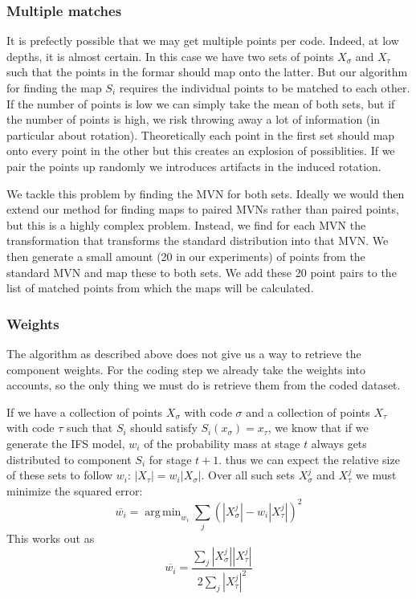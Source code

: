 \documentclass[11pt, twocolumn]{article}
\theoremstyle{definition}
\DeclareMathOperator*{\argmin}{arg\,min}
\begin{document}
\subsubsection{Multiple matches}

It is prefectly possible that we may get multiple points per code. Indeed, at low depths, it is almost certain. In this case we have two sets of points $X_\sigma$ and $X_\tau$ such that the points in the formar should map onto the latter. But our algorithm for finding the map $S_i$ requires the individual points to be matched to each other. If the number of points is low we can simply take the mean of both sets, but if the number of points is high, we risk throwing away a lot of information (in particular about rotation). Theoretically each point in the first set should map onto every point in the other but this creates an explosion of possiblities. If we pair the points up randomly we introduces artifacts in the induced rotation.

We tackle this problem by finding the MVN for both sets. Ideally we would then extend our method for finding maps to paired MVNs rather than paired points, but this is a highly complex problem. Instead, we find for each MVN the transformation that transforms the standard distribution into that MVN. We then generate a small amount (20 in our experiments) of points from the standard MVN and map these to both sets. We add these 20 point pairs to the list of matched points from which the maps will be calculated. 

\subsubsection{Weights}

The algorithm as described above does not give us a way to retrieve the component weights. For the coding step we already take the weights into accounts, so the only thing we must do is retrieve them from the coded dataset. 

If we have a collection of points $X_\sigma$ with code $\sigma$ and a collection of points $X_\tau$ with code $\tau$ such that $S_i$ should satisfy $S_i(x_\sigma) = x_\tau$, we know that if we generate the IFS model, $w_i$ of the probability mass at stage $t$ always gets distributed to component $S_i$ for stage $t + 1$. thus we can expect the relative size of these sets to follow $w_i$: $|X_\tau| = w_i |X_\sigma|$. Over all such sets $X_\sigma^j$ and $X_\tau^j$ we must minimize the squared error:
\[
\overline{w_i} = \argmin_{w_i} \sum_{j} \left( |X_\sigma^j| - w_i |X_\tau^j| \right)^2
\]
This works out as 
\[
\overline{w_i} = \frac{\sum_{j}|X_\sigma^j||X_\tau^j|}{2\sum_{j}|X_\tau^j|^2}
\]
\end{document}
